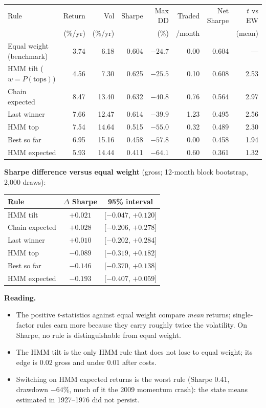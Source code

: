 \documentclass[11pt]{article}
\begin{document}
\begin{center}
\footnotesize
\setlength{\tabcolsep}{4pt}
\begin{tabular}{lrrrrrrr}
\toprule
Rule & Return & Vol & Sharpe & Max DD & Traded & Net Sharpe & $t$ vs EW \\
 & (\%/yr) & (\%/yr) & & (\%) & /month & & (mean) \\
\midrule
Equal weight (benchmark) & 3.74 & 6.18 & 0.604 & $-24.7$ & 0.00 & 0.604 & --- \\
HMM tilt ($w=P(\text{tops})$) & 4.56 & 7.30 & 0.625 & $-25.5$ & 0.10 & 0.608 & 2.53 \\
Chain expected & 8.47 & 13.40 & 0.632 & $-40.8$ & 0.76 & 0.564 & 2.97 \\
Last winner & 7.66 & 12.47 & 0.614 & $-39.9$ & 1.23 & 0.495 & 2.56 \\
HMM top & 7.54 & 14.64 & 0.515 & $-55.0$ & 0.32 & 0.489 & 2.30 \\
Best so far & 6.95 & 15.16 & 0.458 & $-57.8$ & 0.00 & 0.458 & 1.94 \\
HMM expected & 5.93 & 14.44 & 0.411 & $-64.1$ & 0.60 & 0.361 & 1.32 \\
\bottomrule
\end{tabular}
\end{center}

\textbf{Sharpe difference versus equal weight} (gross; 12-month block bootstrap, 2{,}000 draws):
\begin{center}
\begin{tabular}{lcc}
\toprule
Rule & $\Delta$ Sharpe & 95\% interval \\
\midrule
HMM tilt & $+0.021$ & [$-0.047$, $+0.120$] \\
Chain expected & $+0.028$ & [$-0.206$, $+0.278$] \\
Last winner & $+0.010$ & [$-0.202$, $+0.284$] \\
HMM top & $-0.089$ & [$-0.319$, $+0.182$] \\
Best so far & $-0.146$ & [$-0.370$, $+0.138$] \\
HMM expected & $-0.193$ & [$-0.407$, $+0.059$] \\
\bottomrule
\end{tabular}
\end{center}

\textbf{Reading.}
\begin{itemize}
\item The positive $t$-statistics against equal weight compare \emph{mean} returns; single-factor rules earn more because they carry roughly twice the volatility. On Sharpe, no rule is distinguishable from equal weight.
\item The HMM tilt is the only HMM rule that does not lose to equal weight; its edge is 0.02 gross and under 0.01 after costs.
\item Switching on HMM expected returns is the worst rule (Sharpe 0.41, drawdown $-64\%$, much of it the 2009 momentum crash): the state means estimated in 1927--1976 did not persist.
\end{itemize}
\end{document}
